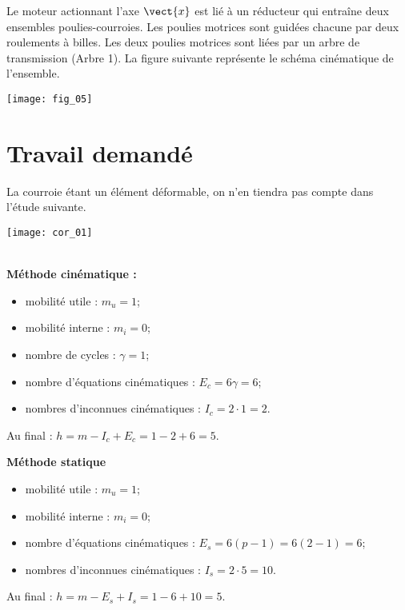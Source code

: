 Le moteur actionnant l’axe $\vect{x}$ est lié à un réducteur qui entraîne deux ensembles poulies-courroies. Les poulies motrices sont guidées chacune par deux roulements à billes. Les deux poulies motrices sont liées par un arbre de transmission (Arbre 1). La
figure suivante représente le schéma cinématique de l’ensemble.

\begin{marginfigure}
\texttt{[image: fig\_05]}
\end{marginfigure}
\fi


\section*{Travail demandé}

\ifprof
\else
La courroie étant un élément déformable, on n’en tiendra pas compte dans l’étude suivante.
\fi

\ifprof
\begin{marginfigure}
\texttt{[image: cor\_01]}
\end{marginfigure}

\begin{corrige} ~\\



\textbf{Méthode cinématique :}
\begin{itemize}
\item mobilité utile : $m_u=1$;
\item mobilité interne : $m_i=0$;
\item nombre de cycles : $\gamma = 1$;
\item nombre d'équations cinématiques : $E_c=6\gamma = 6$;
\item nombres d'inconnues cinématiques : $I_c=2\cdot 1=2$.
\end{itemize}
Au final : $h=m-I_c+E_c=1-2+6=5$.

\textbf{Méthode statique}
\begin{itemize}
\item mobilité utile : $m_u=1$;
\item mobilité interne : $m_i=0$;
\item nombre d'équations cinématiques : $E_s=6(p-1)=6(2-1)= 6$;
\item nombres d'inconnues cinématiques : $I_s=2\cdot 5 = 10$.
\end{itemize}
Au final : $h=m-E_s+I_s=1-6+10=5$.

\end{corrige}
\else
\fi

